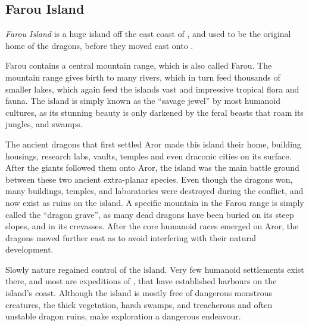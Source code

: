 \subsection{Farou Island}
\label{sec:Farou Island}

\emph{Farou Island} is a huge island off the east coast of
, and used to be the original home of the dragons, before
they moved east onto .

Farou contains a central mountain range, which is also called Farou. The
mountain range gives birth to many rivers, which in turn feed thousands of
smaller lakes, which again feed the islands vast and impressive tropical flora
and fauna. The island is simply known as the ``savage jewel'' by most humanoid
cultures, as its stunning beauty is only darkened by the feral beasts that
roam its jungles, and swamps.

The ancient dragons that first settled Aror made this island their home,
building housings, research labs, vaults, temples and even draconic cities on
its surface. After the giants followed them onto Aror, the island was the main
battle ground between these two ancient extra-planar species. Even though the
dragons won, many buildings, temples, and laboratories were destroyed during
the conflict, and now exist as ruins on the island. A specific mountain in the
Farou range is simply called the ``dragon grave'', as many dead dragons have
been buried on its steep slopes, and in its crevasses. After the core humanoid
races emerged on Aror, the dragons moved further east as to avoid interfering
with their natural development.

Slowly nature regained control of the island. Very few humanoid settlements
exist there, and most are expeditions of , that
have established harbours on the island's coast. Although the island is
mostly free of dangerous monstrous creatures, the thick vegetation, harsh
swamps, and treacherous and often unstable dragon ruins, make exploration
a dangerous endeavour.

